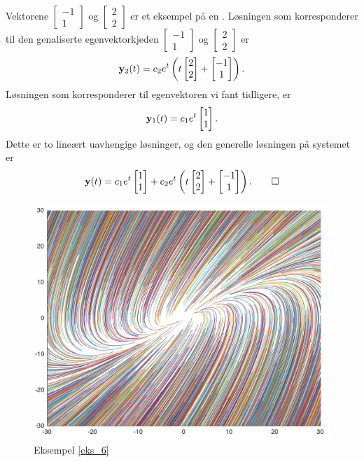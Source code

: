 \begin{ex}
\label{eks_6}
Vektorene 
$
\begin{bmatrix}
-1  \\
1 
\end{bmatrix}
$
og 
$
\begin{bmatrix}
2  \\
2 
\end{bmatrix}
$
er et eksempel på en . 
Løsningen som korresponderer til den genaliserte egenvektorkjeden 
$
\begin{bmatrix}
-1  \\
1 
\end{bmatrix}
$
og 
$
\begin{bmatrix}
2  \\
2 
\end{bmatrix}
$
er 
\[
\mathbf{y}_2(t) = c_2 e^t
\left(
t
\begin{bmatrix}
2  \\
2 
\end{bmatrix}
+
\begin{bmatrix}
-1  \\
1 
\end{bmatrix}
\right).
\]
Løsningen som korresponderer til egenvektoren 
vi fant tidligere, er 
\[
\mathbf{y}_1(t) = c_1 e^t
\begin{bmatrix}
1  \\
1 
\end{bmatrix}.
\]
Dette er to lineært uavhengige løsninger, og den generelle løsningen på systemet er 
\[
\mathbf{y}(t) = c_1 e^t
\begin{bmatrix}
1  \\
1 
\end{bmatrix}
+ c_2 e^t
\left(
t
\begin{bmatrix}
2  \\
2 
\end{bmatrix}
+
\begin{bmatrix}
-1  \\
1 
\end{bmatrix}
\right).\qedhere
\]
\end{ex}


\begin{figure}[htbp]
  \begin{center}
	\includegraphics[scale=.1]{eks_6.jpg}
	\captionsetup{labelformat=empty}
	\caption{Eksempel \ref{eks_6}}
	\end{center}
\end{figure}


\kapittelslutt

